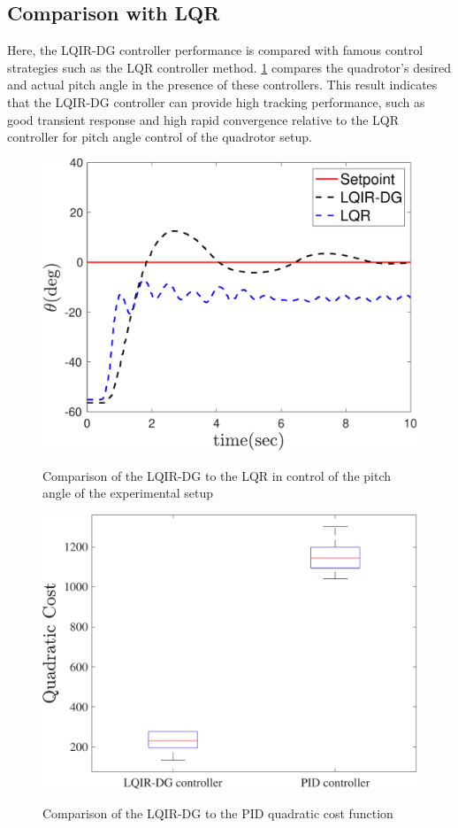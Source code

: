 \documentclass[3p,times]{elsarticle}
\begin{document}
\subsection{Comparison with LQR}
\noindent Here, the LQIR-DG controller performance is compared with famous control strategies such as the LQR controller method. \figurename{\ref{fig:compare}} compares the quadrotor's desired and actual pitch angle in the presence of these controllers. This result indicates that the LQIR-DG controller can provide high tracking performance, such as good transient response and high rapid convergence relative to the LQR controller for pitch angle control of the quadrotor setup.
\begin{figure}[!h]
	\centering
	{\includegraphics[width=.49\linewidth]{../Figure/implementation/lqidgvslqr/lqidgvslqr_pitch}
	}
	\caption{Comparison of the LQIR-DG to the LQR in control of the pitch angle of the experimental setup}
	\label{fig:compare}
\end{figure}

\begin{figure}[!h]
	\centering
	{\includegraphics[width=.49\linewidth]{../Figure/implementation/box_plot/lqidgvsboxplot}
	}
	\caption{Comparison of the LQIR-DG to the PID quadratic cost function}
	\label{fig:compare_boxplot}
\end{figure}
\end{document}
